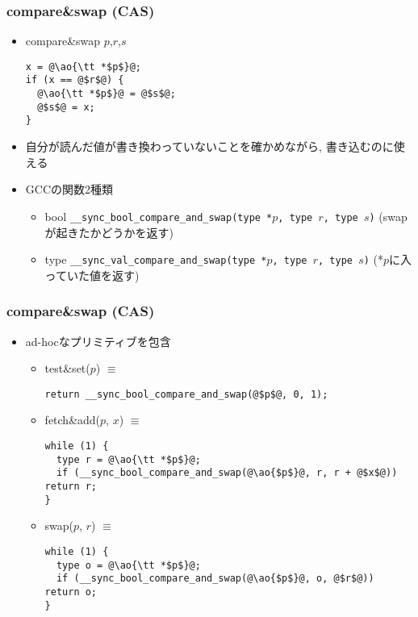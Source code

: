 \documentclass[12pt,dvipdfmx]{beamer}
\begin{document}
\begin{frame}[fragile]
  \frametitle{compare\&swap (CAS)}
  \begin{itemize}
  \item compare\&swap $p$,$r$,$s$
\begin{lstlisting}
x = @\ao{\tt *$p$}@;
if (x == @$r$@) {
  @\ao{\tt *$p$}@ = @$s$@;
  @$s$@ = x;
}
\end{lstlisting}

\item 自分が読んだ値が書き換わっていないことを確かめながら, 書き込むのに使える
  
\item GCCの関数2種類
  \begin{itemize}
  \item bool {\tt \_\_sync\_bool\_compare\_and\_swap(type *$p$, type $r$, type $s$)}
    (swapが起きたかどうかを返す)
  \item type {\tt \_\_sync\_val\_compare\_and\_swap(type *$p$, type $r$, type $s$)}
    (*$p$に入っていた値を返す)
  \end{itemize}
\end{itemize}
\end{frame}

\begin{frame}[fragile]
  \frametitle{compare\&swap (CAS)}
  \begin{itemize}
  \item [] ad-hocなプリミティブを包含
    \begin{itemize}
    \item test\&set($p$) $\equiv$
\begin{lstlisting}
return __sync_bool_compare_and_swap(@$p$@, 0, 1);
\end{lstlisting}
\item fetch\&add($p$, $x$) $\equiv$
\begin{lstlisting}
while (1) {
  type r = @\ao{\tt *$p$}@;
  if (__sync_bool_compare_and_swap(@\ao{$p$}@, r, r + @$x$@)) return r;
}
\end{lstlisting}
\item swap($p$, $r$) $\equiv$
\begin{lstlisting}
while (1) {
  type o = @\ao{\tt *$p$}@;
  if (__sync_bool_compare_and_swap(@\ao{$p$}@, o, @$r$@)) return o;
}
\end{lstlisting}
\end{itemize}
\end{itemize}
\end{frame}  
\end{document}
